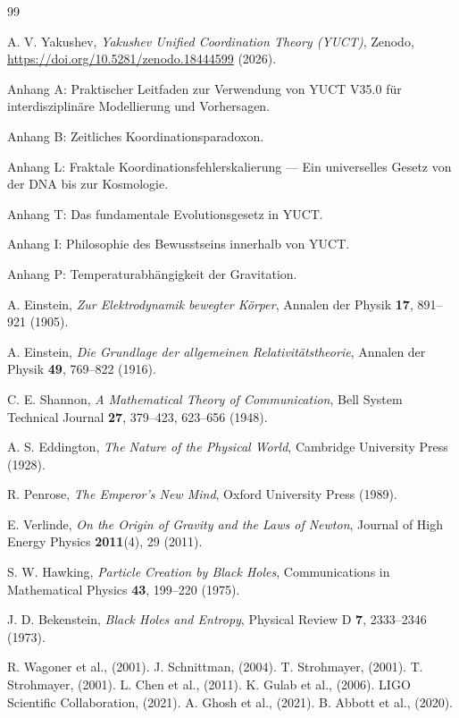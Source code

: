 \documentclass[12pt,a4paper]{article}
\begin{document}
	\begin{thebibliography}{99}
		
		A. V. Yakushev, \emph{Yakushev Unified Coordination Theory (YUCT)}, Zenodo, \url{https://doi.org/10.5281/zenodo.18444599} (2026).
		
		Anhang A: Praktischer Leitfaden zur Verwendung von YUCT V35.0 für interdisziplinäre Modellierung und Vorhersagen.
		
		Anhang B: Zeitliches Koordinationsparadoxon.
		
		Anhang L: Fraktale Koordinationsfehlerskalierung — Ein universelles Gesetz von der DNA bis zur Kosmologie.
		
		Anhang T: Das fundamentale Evolutionsgesetz in YUCT.
		
		Anhang I: Philosophie des Bewusstseins innerhalb von YUCT.
		
		Anhang P: Temperaturabhängigkeit der Gravitation.
		
		A. Einstein, \emph{Zur Elektrodynamik bewegter Körper}, Annalen der Physik \textbf{17}, 891–921 (1905).
		
		A. Einstein, \emph{Die Grundlage der allgemeinen Relativitätstheorie}, Annalen der Physik \textbf{49}, 769–822 (1916).
		
		C. E. Shannon, \emph{A Mathematical Theory of Communication}, Bell System Technical Journal \textbf{27}, 379–423, 623–656 (1948).
		
		A. S. Eddington, \emph{The Nature of the Physical World}, Cambridge University Press (1928).
		
		R. Penrose, \emph{The Emperor's New Mind}, Oxford University Press (1989).
		
		E. Verlinde, \emph{On the Origin of Gravity and the Laws of Newton}, Journal of High Energy Physics \textbf{2011}(4), 29 (2011).
		
		S. W. Hawking, \emph{Particle Creation by Black Holes}, Communications in Mathematical Physics \textbf{43}, 199–220 (1975).
		
		J. D. Bekenstein, \emph{Black Holes and Entropy}, Physical Review D \textbf{7}, 2333–2346 (1973).
		
		 R. Wagoner et al., (2001).
		 J. Schnittman, (2004).
		 T. Strohmayer, (2001).
		 T. Strohmayer, (2001).
		 L. Chen et al., (2011).
		 K. Gulab et al., (2006).
		 LIGO Scientific Collaboration, (2021).
		 A. Ghosh et al., (2021).
		 B. Abbott et al., (2020).
		
	\end{thebibliography}
	
\end{document}
